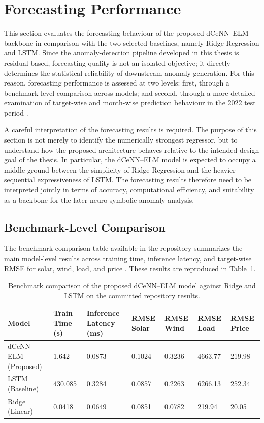\section{Forecasting Performance}
\label{sec:forecasting_performance}

This section evaluates the forecasting behaviour of the proposed dCeNN--ELM backbone in comparison with the two selected baselines, namely Ridge Regression and LSTM. Since the anomaly-detection pipeline developed in this thesis is residual-based, forecasting quality is not an isolated objective; it directly determines the statistical reliability of downstream anomaly generation. For this reason, forecasting performance is assessed at two levels: first, through a benchmark-level comparison across models; and second, through a more detailed examination of target-wise and month-wise prediction behaviour in the 2022 test period \cite{repo_thesis_grid_anomaly}.

A careful interpretation of the forecasting results is required. The purpose of this section is not merely to identify the numerically strongest regressor, but to understand how the proposed architecture behaves relative to the intended design goal of the thesis. In particular, the dCeNN--ELM model is expected to occupy a middle ground between the simplicity of Ridge Regression and the heavier sequential expressiveness of LSTM. The forecasting results therefore need to be interpreted jointly in terms of accuracy, computational efficiency, and suitability as a backbone for the later neuro-symbolic anomaly analysis.

\subsection{Benchmark-Level Comparison}

The benchmark comparison table available in the repository summarizes the main model-level results across training time, inference latency, and target-wise RMSE for solar, wind, load, and price \cite{repo_thesis_grid_anomaly}. These results are reproduced in Table~\ref{tab:benchmark_comparison_ch71}.

\begin{table}[H]
	\centering
	\caption{Benchmark comparison of the proposed dCeNN--ELM model against Ridge and LSTM on the committed repository results.}
	\label{tab:benchmark_comparison_ch71}
	\small
	\begin{tabular}{|p{2.5cm}|p{1.8cm}|p{2.0cm}|p{1.8cm}|p{1.8cm}|p{1.8cm}|p{1.8cm}|}
		\hline
		\textbf{Model} & \textbf{Train Time (s)} & \textbf{Inference Latency (ms)} & \textbf{RMSE Solar} & \textbf{RMSE Wind} & \textbf{RMSE Load} & \textbf{RMSE Price} \\
		\hline
		dCeNN--ELM (Proposed) & 1.642 & 0.0873 & 0.1024 & 0.3236 & 4663.77 & 219.98 \\
		\hline
		LSTM (Baseline) & 430.085 & 0.3284 & 0.0857 & 0.2263 & 6266.13 & 252.34 \\
		\hline
		Ridge (Linear) & 0.0418 & 0.0649 & 0.0851 & 0.0782 & 219.94 & 20.05 \\
		\hline
	\end{tabular}
\end{table}


